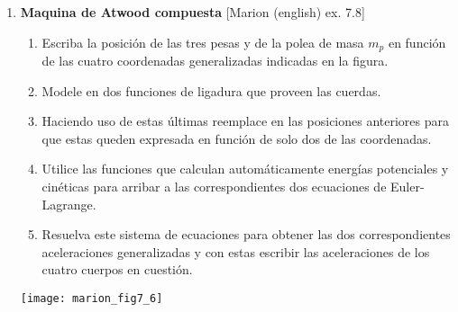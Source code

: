 \documentclass[11pt, spanish, a4paper, twoside]{article}
\begin{document}
\begin{enumerate}
\item
\begin{minipage}[t][9cm]{0.6\textwidth}
	\textbf{Maquina de Atwood compuesta} [Marion (english) ex. 7.8]\\ 
	\begin{enumerate}
		\item Escriba la posición de las tres pesas y de la polea de masa \(m_p\) en función de las cuatro coordenadas generalizadas indicadas en la figura.
		\item Modele en dos funciones de ligadura que proveen las cuerdas.
		\item Haciendo uso de estas últimas reemplace en las posiciones anteriores para que estas queden expresada en función de solo dos de las coordenadas.
		\item Utilice las funciones que calculan automáticamente energías potenciales y cinéticas para arribar a las correspondientes dos ecuaciones de Euler-Lagrange.
		\item Resuelva este sistema de ecuaciones para obtener las dos correspondientes aceleraciones generalizadas y con estas escribir las aceleraciones de los cuatro cuerpos en cuestión.
	\end{enumerate}
\end{minipage}
\begin{minipage}[c][0.5em][t]{0.3\textwidth}
	\texttt{[image: marion\_fig7\_6]}
\end{minipage}



\end{enumerate}
\end{document}
